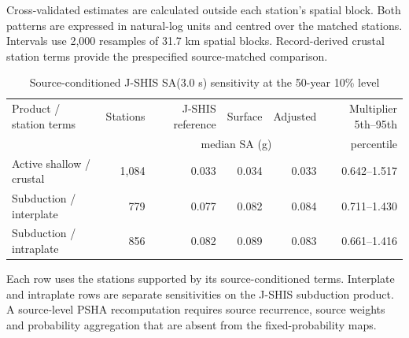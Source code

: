 \documentclass[10pt]{article}
\begin{document}
\begin{table}[H]
\centering
\caption{Kanto SA(5.0 s) comparison with the Sung et al. simulation field}
\scriptsize
{}

\vspace{0.3em}
\raggedright\footnotesize Cross-validated estimates are calculated outside each station's spatial block. Both patterns are expressed in natural-log units and centred over the matched stations. Intervals use 2,000 resamples of 31.7 km spatial blocks. Record-derived crustal station terms provide the prespecified source-matched comparison.
\end{table}

\begin{table}[H]
\centering
\caption{Source-conditioned J-SHIS SA(3.0 s) sensitivity at the 50-year 10\% level}
\small
\begin{tabular}{lrrrrr}
\toprule
Product / station terms & Stations & J-SHIS reference & Surface & Adjusted & Multiplier 5th--95th \\
 & & \multicolumn{3}{c}{median SA (g)} & percentile \\
\midrule
Active shallow / crustal & 1,084 & 0.033 & 0.034 & 0.033 & 0.642--1.517 \\
Subduction / interplate & 779 & 0.077 & 0.082 & 0.084 & 0.711--1.430 \\
Subduction / intraplate & 856 & 0.082 & 0.089 & 0.083 & 0.661--1.416 \\
\bottomrule
\end{tabular}

\vspace{0.3em}
\raggedright\footnotesize Each row uses the stations supported by its source-conditioned terms. Interplate and intraplate rows are separate sensitivities on the J-SHIS subduction product. A source-level PSHA recomputation requires source recurrence, source weights and probability aggregation that are absent from the fixed-probability maps.
\end{table}
\end{document}
